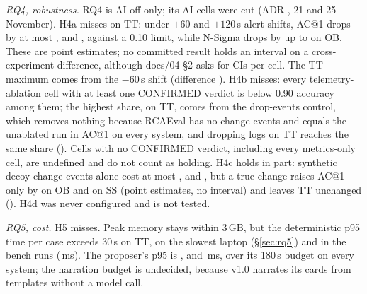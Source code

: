 \emph{RQ4, robustness.}
RQ4 is AI-off only; its AI cells were cut (ADR \allowbreak{}, 21 and 25 November).
H4a misses on TT: under $\pm 60$ and $\pm 120$\,s alert shifts, AC@1 drops by at most ,  and , against a 0.10 limit, while N-Sigma drops by up to  on OB.
These are point estimates; no committed result holds an interval on a cross-experiment difference, although docs/04 §2 asks for CIs per cell.
The TT maximum comes from the $-60$\,s shift (difference ).
H4b misses: every telemetry-ablation cell with at least one \st{CONFIRMED} verdict is below 0.90 accuracy among them; the highest share,  on TT, comes from the drop-events control, which removes nothing because RCAEval has no change events and equals the unablated run in AC@1 on every system, and dropping logs on TT reaches the same share ().
Cells with no \st{CONFIRMED} verdict, including every metrics-only cell, are undefined and do not count as holding.
H4c holds in part: synthetic decoy change events alone cost at most ,  and , but a true change raises AC@1 only by  on OB and  on SS (point estimates, no interval) and leaves TT unchanged ().
H4d was never configured and is not tested.

\emph{RQ5, cost.}
H5 misses.
Peak memory stays within 3\,GB, but the deterministic p95 time per case exceeds 30\,s on TT, on the slowest laptop (\S\ref{sec:rq5}) and in the bench runs (\,ms).
The proposer's p95 is ,  and \,ms, over its 180\,s budget on every system; the narration budget is undecided, because v1.0 narrates its cards from templates without a model call.

